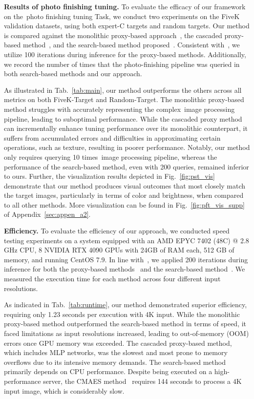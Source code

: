 \documentclass{article}
\newcommand{\pipeline}{image processing pipeline\xspace}
\newcommand{\taskPFT}{photo finishing tuning\xspace}
\begin{document}
\noindent\textbf{Results of \taskPFT.}
To evaluate the efficacy of our framework on the~\taskPFT Task, we conduct two experiments on the FiveK validation datasets, using both expert-C targets and random targets. Our method is compared against the monolithic proxy-based approach~\cite{tseng2019hyperparameter}, the cascaded proxy-based method~\cite{tseng2022neural}, and the search-based method proposed~\cite{mosleh2020hardware}. Consistent with~\cite{tseng2022neural}, we utilize 100 iterations during inference for the proxy-based methods. Additionally, we record the number of times that the photo-finishing pipeline was queried in both search-based methods and our approach.

As illustrated in Tab.~\ref{tab:main}, our method outperforms the others across all metrics on both FiveK-Target and Random-Target. The monolithic proxy-based method struggles with accurately representing the complex~\pipeline, leading to suboptimal performance. While the cascaded proxy method can incrementally enhance tuning performance over its monolithic counterpart, it suffers from accumulated errors and difficulties in approximating certain operations, such as texture, resulting in poorer performance. Notably, our method only requires querying 10 times~\pipeline, whereas the performance of the search-based method, even with 200 queries, remained inferior to ours. Further, the visualization results depicted in Fig.~\ref{fig:pst_vis} demonstrate that our method produces visual outcomes that most closely match the target images, particularly in terms of color and brightness, when compared to all other methods. More visualization can be found in Fig.~\ref{fig:pft_vis_supp} of Appendix~\ref{sec:appen_a2}.




\noindent\textbf{Efficiency.}
To evaluate the efficiency of our approach, we conducted speed testing experiments on a system equipped with an AMD EPYC 7402 (48C) @ 2.8 GHz CPU, 8 NVIDIA RTX 4090 GPUs with 24GB of RAM each, 512 GB of memory, and running CentOS 7.9. In line with~\cite{tseng2022neural}, we applied 200 iterations during inference for both the proxy-based methods~\cite{tseng2019hyperparameter, tseng2022neural} and the search-based method~\cite{mosleh2020hardware}. We measured the execution time for each method across four different input resolutions.

As indicated in Tab.~\ref{tab:runtime}, our method demonstrated superior efficiency, requiring only 1.23 seconds per execution with 4K input. While the monolithic proxy-based method outperformed the search-based method in terms of speed, it faced limitations as input resolutions increased, leading to out-of-memory (OOM) errors once GPU memory was exceeded. The cascaded proxy-based method, which includes MLP networks, was the slowest and most prone to memory overflows due to its intensive memory demands. The search-based method primarily depends on CPU performance. Despite being executed on a high-performance server, the CMAES method~\cite{mosleh2020hardware} requires 144 seconds to process a 4K input image, which is considerably slow.
\end{document}
